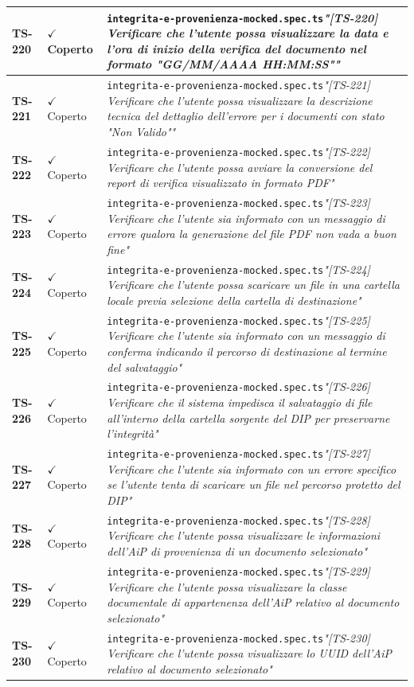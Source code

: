 \documentclass[a4paper,12pt]{article}
\newcommand{\ok}{\textcolor{green!60!black}{$\checkmark$ Coperto}}
\newcommand{\f}[1]{\nolinkurl{#1}\newline}
\newcommand{\q}[1]{\textit{#1}}
\begin{document}
\begin{longtable}{|p{1.5cm}|p{3.0cm}|p{10.5cm}|}
\textbf{TS-220} & \ok & \f{integrita-e-provenienza-mocked.spec.ts}\q{"[TS-220] Verificare che l'utente possa visualizzare la data e l'ora di inizio della verifica del documento nel formato "GG/MM/AAAA HH:MM:SS""} \\ \hline
\textbf{TS-221} & \ok & \f{integrita-e-provenienza-mocked.spec.ts}\q{"[TS-221] Verificare che l'utente possa visualizzare la descrizione tecnica del dettaglio dell'errore per i documenti con stato "Non Valido""} \\ \hline
\textbf{TS-222} & \ok & \f{integrita-e-provenienza-mocked.spec.ts}\q{"[TS-222] Verificare che l'utente possa avviare la conversione del report di verifica visualizzato in formato PDF"} \\ \hline
\textbf{TS-223} & \ok & \f{integrita-e-provenienza-mocked.spec.ts}\q{"[TS-223] Verificare che l'utente sia informato con un messaggio di errore qualora la generazione del file PDF non vada a buon fine"} \\ \hline
\textbf{TS-224} & \ok & \f{integrita-e-provenienza-mocked.spec.ts}\q{"[TS-224] Verificare che l'utente possa scaricare un file in una cartella locale previa selezione della cartella di destinazione"} \\ \hline
\textbf{TS-225} & \ok & \f{integrita-e-provenienza-mocked.spec.ts}\q{"[TS-225] Verificare che l'utente sia informato con un messaggio di conferma indicando il percorso di destinazione al termine del salvataggio"} \\ \hline
\textbf{TS-226} & \ok & \f{integrita-e-provenienza-mocked.spec.ts}\q{"[TS-226] Verificare che il sistema impedisca il salvataggio di file all'interno della cartella sorgente del DIP per preservarne l'integrità"} \\ \hline
\textbf{TS-227} & \ok & \f{integrita-e-provenienza-mocked.spec.ts}\q{"[TS-227] Verificare che l'utente sia informato con un errore specifico se l'utente tenta di scaricare un file nel percorso protetto del DIP"} \\ \hline
\textbf{TS-228} & \ok & \f{integrita-e-provenienza-mocked.spec.ts}\q{"[TS-228] Verificare che l'utente possa visualizzare le informazioni dell'AiP di provenienza di un documento selezionato"} \\ \hline
\textbf{TS-229} & \ok & \f{integrita-e-provenienza-mocked.spec.ts}\q{"[TS-229] Verificare che l'utente possa visualizzare la classe documentale di appartenenza dell'AiP relativo al documento selezionato"} \\ \hline
\textbf{TS-230} & \ok & \f{integrita-e-provenienza-mocked.spec.ts}\q{"[TS-230] Verificare che l'utente possa visualizzare lo UUID dell'AiP relativo al documento selezionato"} \\ \hline

\end{longtable}
\end{document}
